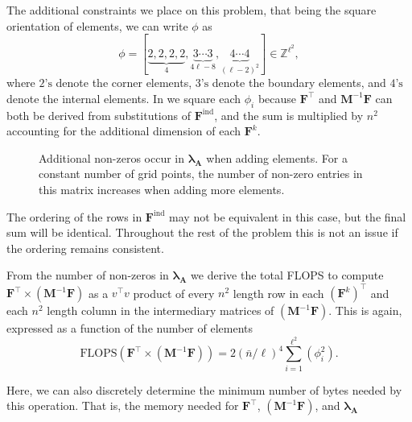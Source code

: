 The additional constraints we place on this problem, that being the square orientation of elements, we can write $\phi$ as 
\begin{equation}
	\phi = \left[ \underbrace{2, 2, 2, 2}_{4}, \underbrace{3 \cdots 3}_{4\ell - 8}, \underbrace{4 \cdots 4}_{(\ell-2)^2} \right] \in \mathbb{Z}^{\ell^2}, 
\end{equation}
where $2\text{'s}$ denote the corner elements, $3\text{'s}$ denote the boundary elements, and $4\text{'s}$ denote the internal elements. 
In  we square each $\phi_i$ because $\textbf{F}^{\intercal}$ and  $\textbf{M}^{-1}\textbf{F}$ can both be derived from substitutions of $\textbf{F}^{\text{ind}}$, and the sum is multiplied by $n^2$ accounting for the additional dimension of each $\textbf{F}^k$. 


\begin{figure}[!t]
	\centering
	
	\caption{Additional non-zeros occur in $\symbf{\lambda}_\textbf{A}$ when adding elements. For a constant number of grid points, the number of non-zero entries in this matrix increases when adding more elements.}
	\label{fig:lambda_diagram}
\end{figure}

%
%


%
%
%
The ordering of the rows in $\textbf{F}^{\text{ind}}$ may not be equivalent in this case, but the final sum will be identical. 
Throughout the rest of the problem this is not an issue if the ordering remains consistent. 

%
%
%
From the number of non-zeros in $\symbf{\lambda}_\textbf{A}$ we derive the total FLOPS to compute $\textbf{F}^{\intercal} \times (\textbf{M}^{-1}\textbf{F})$ as a $v^\intercal v$ product of every $n^2$ length row in each $(\textbf{F}^k)^{\intercal}$ and each $n^2$ length column in the intermediary matrices of $(\textbf{M}^{-1}\textbf{F})$.
This is again, expressed as a function of the number of elements
\begin{equation}
	\text{FLOPS}(\textbf{F}^{\intercal} \times (\textbf{M}^{-1}\textbf{F})) = 2 (\bar{n}/\ell)^4 \sum_{i=1}^{\ell^2} (\phi_i^2).
	\label{eqn:flops_fmf}
\end{equation}


\noindent
Here, we can also discretely determine the minimum number of bytes needed by this operation. 
That is, the memory needed for $\textbf{F}^{\intercal}$, $(\textbf{M}^{-1}\textbf{F})$, and $\symbf{\lambda}_\textbf{A}$


